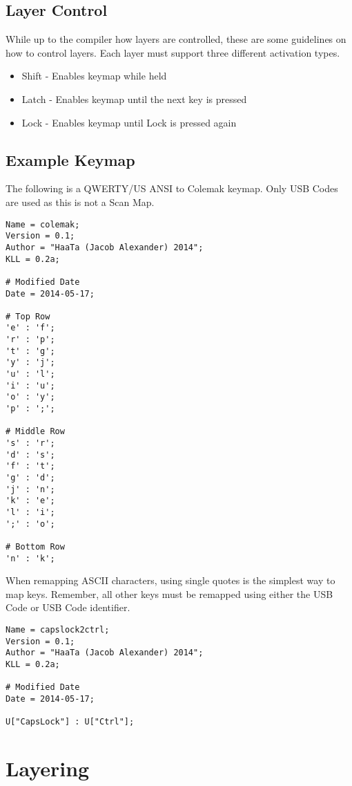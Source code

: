 \documentclass{kiibohd-template}
\begin{document}
\section{Layer Control}

While up to the compiler how layers are controlled, these are some guidelines on how to control layers.
Each layer must support three different activation types.

\begin{itemize}
	\item Shift - Enables keymap while held
	\item Latch - Enables keymap until the next key is pressed
	\item Lock - Enables keymap until Lock is pressed again
\end{itemize}


\section{Example Keymap}

The following is a QWERTY/US ANSI to Colemak keymap.
Only USB Codes are used as this is not a Scan Map.

\begin{lstlisting}
Name = colemak;
Version = 0.1;
Author = "HaaTa (Jacob Alexander) 2014";
KLL = 0.2a;

# Modified Date
Date = 2014-05-17;

# Top Row
'e' : 'f';
'r' : 'p';
't' : 'g';
'y' : 'j';
'u' : 'l';
'i' : 'u';
'o' : 'y';
'p' : ';';

# Middle Row
's' : 'r';
'd' : 's';
'f' : 't';
'g' : 'd';
'j' : 'n';
'k' : 'e';
'l' : 'i';
';' : 'o';

# Bottom Row
'n' : 'k';
\end{lstlisting}

When remapping ASCII characters, using single quotes is the simplest way to map keys.
Remember, all other keys must be remapped using either the USB Code or USB Code identifier.

\begin{lstlisting}
Name = capslock2ctrl;
Version = 0.1;
Author = "HaaTa (Jacob Alexander) 2014";
KLL = 0.2a;

# Modified Date
Date = 2014-05-17;

U["CapsLock"] : U["Ctrl"];
\end{lstlisting}


\chapter{Layering}
\end{document}
